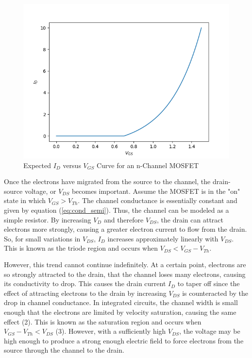\begin{figure}[h!]
	\centering
	\includegraphics[scale=0.75]{./images/id_vs_vgs.PNG}
	\caption{Expected $I_D$ versus $V_{GS}$ Curve for an n-Channel MOSFET}
	\label{fig:id_vs_vgs}
\end{figure}

\FloatBarrier

Once the electrons have migrated from the source to the channel, the drain-source voltage, or $V_{DS}$ becomes important. Assume the MOSFET is in the "on" state in which $V_{GS} > V_{Th}$. The channel conductance is essentially constant and given by equation (\ref{eq:cond_semi}). Thus, the channel can be modeled as a simple resistor. By increasing $V_{D}$ and therefore $V_{DS}$, the drain can attract electrons more strongly, causing a greater electron current to flow from the drain. So, for small variations in $V_{DS}$, $I_{D}$ increases approximately linearly with $V_{DS}$. This is known as the triode region and occurs when $V_{DS} < V_{GS} - V_{Th}$.

However, this trend cannot continue indefinitely. At a certain point, electrons are so strongly attracted to the drain, that the channel loses many electrons, causing its conductivity to drop. This causes the drain current $I_{D}$ to taper off since the effect of attracting electrons to the drain by increasing $V_{DS}$ is counteracted by the drop in channel conductance. In integrated circuits, the channel width is small enough that the electrons are limited by velocity saturation, causing the same effect (2). This is known as the saturation region and occurs when $V_{GS} - V_{Th} < V_{DS}$ (3). However, with a sufficiently high $V_{DS}$, the voltage may be high enough to produce a strong enough electric field to force electrons from the source through the channel to the drain.

